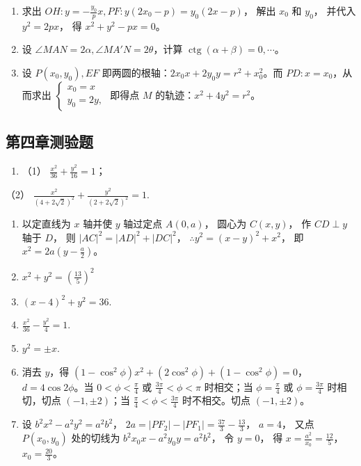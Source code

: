 \begin{enumerate}
\def\labelenumi{\arabic{enumi}.}
\setcounter{enumi}{11}
\item
  求出 \(OH: y = -\frac{y_0}{p} x, PF: y(2x_0 - p) = y_0(2x - p)\)，
  解出 \(x_0\) 和 \(y_0\)， 并代入 \(y^2 = 2px\)， 得
  \(x^2 + y^2 - px = 0\)。
\item
  设 \(\angle MAN = 2\alpha, \angle MA'N = 2\theta\)，计算
  \(\operatorname{ctg}(\alpha + \beta) = 0, \cdots\)。
\item
  设 \(P(x_0, y_0), EF\)
  即两圆的根轴：\(2x_0x + 2y_0y = r^2 + x_0^2\)。而
  \(PD: x = x_0\)，从而求出
  \(\left\{ \begin{array}{l} x_0 = x \\ y_0 = 2y, \end{array} \right.\)
  即得点 \(M\) 的轨迹：\(x^2 + 4y^2 = r^2\)。
\end{enumerate}

\subsection{第四章测验题}\label{ux7b2cux56dbux7ae0ux6d4bux9a8cux9898-1}

\begin{enumerate}
\def\labelenumi{\arabic{enumi}.}
\tightlist
\item
  （1） \(\frac{x^2}{36} + \frac{y^2}{16} = 1\)；
\end{enumerate}

（2）
\(\frac{x^2}{(4 + 2\sqrt{2})^2} + \frac{y^2}{(2 + 2\sqrt{2})^2} = 1.\)

\begin{enumerate}
\def\labelenumi{\arabic{enumi}.}
\setcounter{enumi}{2}
\item
  以定直线为 \(x\) 轴并使 \(y\) 轴过定点 \(A(0, a)\)， 圆心为
  \(C(x, y)\)， 作 \(CD \perp y\) 轴于 \(D\)， 则
  \(|AC|^2 = |AD|^2 + |DC|^2\)， \(\therefore y^2 = (x - y)^2 + x^2\)，
  即 \(x^2 = 2a\left(y - \frac{a}{2}\right)\)。
\item
  \(x^{2} + y^{2} = \left(\frac{13}{5}\right)^{2}\)
\item
  \((x - 4)^{2} + y^{2} = 36.\)
\item
  \(\frac{x^2}{36} - \frac{y^2}{4} = 1.\)
\item
  \(y^{2} = \pm x.\)
\item
  消去 \(y\)，得
  \((1 - \cos^2\phi)x^2 + (2\cos^2\phi) + (1 - \cos^2\phi) = 0\)，\(d = 4\cos 2\phi\)。当
  \(0 < \phi < \frac{\pi}{4}\) 或 \(\frac{3\pi}{4} < \phi < \pi\)
  时相交；当 \(\phi = \frac{\pi}{4}\) 或 \(\phi = \frac{3\pi}{4}\)
  时相切，切点 \((-1, \pm 2)\)；当
  \(\frac{\pi}{4} < \phi < \frac{3\pi}{4}\) 时不相交。切点
  \((-1, \pm 2)\)。
\item
  设 \(b^2 x^2 - a^2 y^2 = a^2 b^2\)，
  \(2a = |PF_2| - |PF_1| = \frac{37}{3} - \frac{13}{3}\)， \(a = 4\)，
  又点 \(P(x_0, y_0)\) 处的切线为 \(b^2 x_0 x - a^2 y_0 y = a^2 b^2\)，
  令 \(y = 0\)， 得 \(x = \frac{a^2}{x_0} = \frac{12}{5}\)，
  \(x_0 = \frac{20}{3}\)。
\end{enumerate}

